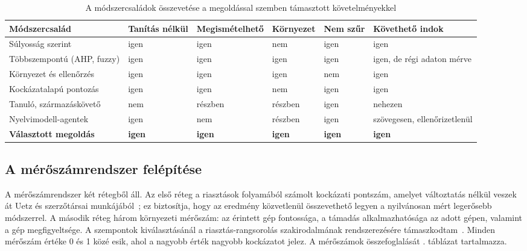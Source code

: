 \begin{table}[H]
    \centering
    \caption{A módszercsaládok összevetése a megoldással szemben támasztott követelményekkel}
    \label{tab:valasztas}
    \small
    \begin{tabular}{|L{3.4cm}|L{1.5cm}|L{1.8cm}|L{1.6cm}|L{1.7cm}|L{1.9cm}|}
        \hline
        \textbf{Módszercsalád} & \textbf{Tanítás nélkül} & \textbf{Megismé\-telhető} & \textbf{Környe\-zet} & \textbf{Nem szűr} & \textbf{Követhető indok} \\ \hline
        Súlyosság szerint & igen & igen & nem & igen & igen \\ \hline
        Többszempontú (\ac{AHP}, fuzzy) & igen & igen & igen & igen & igen, de régi adaton mérve \\ \hline
        Környezet és ellenőrzés & igen & igen & igen & nem & igen \\ \hline
        Kockázatalapú pontozás & igen & igen & nem & igen & igen \\ \hline
        Tanuló, származáskövető & nem & részben & részben & igen & nehezen \\ \hline
        Nyelvimodell-agentek & igen & nem & részben & igen & szövegesen, ellenőrizetlenül \\ \hline
        \textbf{Választott megoldás} & \textbf{igen} & \textbf{igen} & \textbf{igen} & \textbf{igen} & \textbf{igen} \\ \hline
    \end{tabular}
\end{table}

\subsection{A mérőszámrendszer felépítése}\label{sec:metrikak}
A mérőszámrendszer két rétegből áll. Az első réteg a riasztások folyamából számolt kockázati pontszám, amelyet változtatás nélkül veszek át Uetz és szerzőtársai munkájából~\cite{uetz2026rba}; ez biztosítja, hogy az eredmény közvetlenül összevethető legyen a nyilvánosan mért legerősebb módszerrel. A második réteg három környezeti mérőszám: az érintett gép fontossága, a támadás alkalmazhatósága az adott gépen, valamint a gép megfigyeltsége. A szempontok kiválasztásánál a riasztás-rangsorolás szakirodalmának rendszerezésére támaszkodtam~\cite{jalalvand2024}. Minden mérőszám értéke 0 és 1 közé esik, ahol a nagyobb érték nagyobb kockázatot jelez. A mérőszámok összefoglalását \az{\ref{tab:metrikak}}. táblázat tartalmazza.

